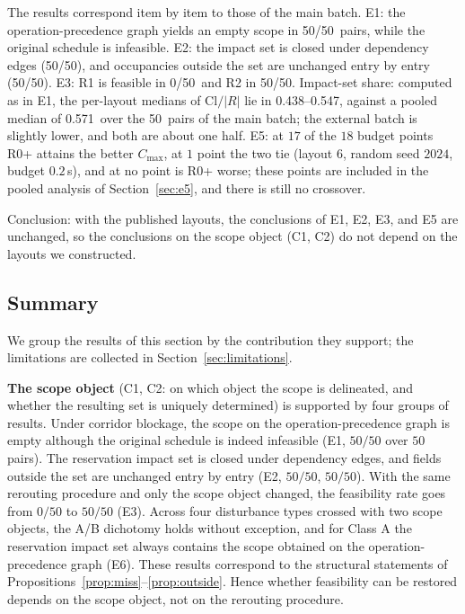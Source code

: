 \documentclass[manuscript,screen,review]{acmart}
\newcommand{\NPairs}{50}
\newcommand{\PassMiss}{\NPairs/\NPairs}      %
\newcommand{\FeasRone}{0/\NPairs}            %
\newcommand{\FeasRtwo}{\NPairs/\NPairs}      %
\newcommand{\PassClosed}{\NPairs/\NPairs}    %
\newcommand{\PassInvar}{\NPairs/\NPairs}     %
\newcommand{\EoneFracMed}{0.571}    %
\newcommand{\NPubPairs}{50}
\newcommand{\PubPassMiss}{\NPubPairs/\NPubPairs}
\newcommand{\PubFeasRone}{0/\NPubPairs}
\newcommand{\PubFeasRtwo}{\NPubPairs/\NPubPairs}
\newcommand{\PubPassClosed}{\NPubPairs/\NPubPairs}
\newcommand{\PubPassInvar}{\NPubPairs/\NPubPairs}
\newcommand{\PubEoneFracLo}{0.438}
\newcommand{\PubEoneFracHi}{0.547}
\begin{document}
The results correspond item by item to those of the main batch.
E1: the operation-precedence graph yields an empty scope in \PubPassMiss\ pairs, while the original schedule is infeasible.
E2: the impact set is closed under dependency edges (\PubPassClosed), and occupancies outside the set are unchanged entry by entry (\PubPassInvar).
E3: R1 is feasible in \PubFeasRone\ and R2 in \PubFeasRtwo.
Impact-set share: computed as in E1, the per-layout medians of \(\mathrm{Cl}/|R|\) lie in \PubEoneFracLo--\PubEoneFracHi,
against a pooled median of \EoneFracMed\ over the \NPairs\ pairs of the main batch; the external batch is slightly lower, and both are about one half.
E5: at \(17\) of the \(18\) budget points R0+ attains the better \(C_{\max}\), at \(1\) point the two tie (layout 6, random seed \(2024\), budget \(0.2\)\,s),
and at no point is R0+ worse; these points are included in the pooled analysis of Section~\ref{sec:e5}, and there is still no crossover.

Conclusion: with the published layouts, the conclusions of E1, E2, E3, and E5 are unchanged, so the conclusions on the scope object (C1, C2) do not depend on the layouts we constructed.

\subsection{Summary}
\label{sec:exp_summary}

We group the results of this section by the contribution they support; the limitations are collected in Section~\ref{sec:limitations}.

\textbf{The scope object} (C1, C2: on which object the scope is delineated, and whether the resulting set is uniquely determined) is supported by four groups of results.
Under corridor blockage, the scope on the operation-precedence graph is empty although the original schedule is indeed infeasible (E1, \(\PassMiss\) over \(\NPairs\) pairs).
The reservation impact set is closed under dependency edges, and fields outside the set are unchanged entry by entry (E2, \(\PassClosed\), \(\PassInvar\)).
With the same rerouting procedure and only the scope object changed, the feasibility rate goes from \(\FeasRone\) to \(\FeasRtwo\) (E3).
Across four disturbance types crossed with two scope objects, the A/B dichotomy holds without exception,
and for Class A the reservation impact set always contains the scope obtained on the operation-precedence graph (E6).
These results correspond to the structural statements of Propositions~\ref{prop:miss}--\ref{prop:outside}.
Hence whether feasibility can be restored depends on the scope object, not on the rerouting procedure.
\end{document}
